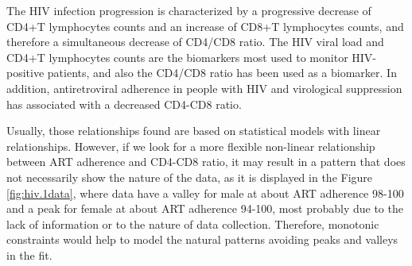 \documentclass[11pt,letterpaper]{article}
\begin{document}


The HIV infection progression is characterized by a progressive decrease of CD4+T lymphocytes  counts and an increase of CD8+T lymphocytes  counts, and therefore a simultaneous decrease of CD4/CD8 ratio.
The HIV viral load and CD4+T lymphocytes counts are the biomarkers most used to monitor HIV-positive patients, and also the CD4/CD8 ratio has been used as a biomarker.  
In addition, antiretroviral adherence in people with HIV and virological suppression has associated with a decreased CD4-CD8 ratio.

Usually, those relationships found are based on statistical models with linear relationships. However,   if we look for a more flexible non-linear relationship between ART adherence and CD4-CD8 ratio, it may result in a pattern that does not necessarily show the nature of the data, as it is displayed in the  Figure \ref{fig:hiv.1data}, where data have a valley for male at about ART adherence 98-100 and a peak for female at about ART adherence 94-100, most probably due to the lack of information or to the nature of data collection.   Therefore, monotonic constraints would help to model the natural patterns avoiding peaks and valleys in the fit. 
\end{document}
